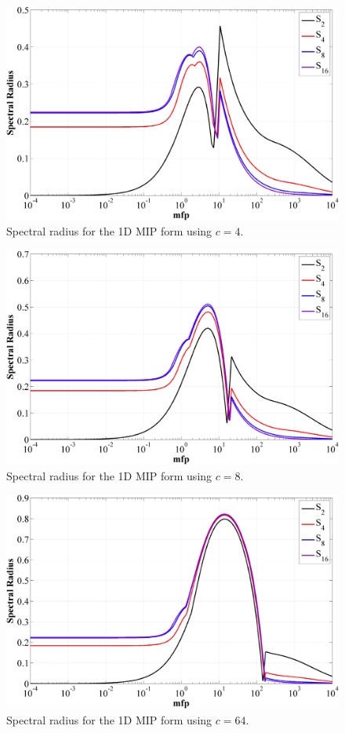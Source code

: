 \begin{figure}
\centering
\includegraphics[width=\textwidth]{figures/appendices/DSA_1D_SI_MIP_C=4.png}
\caption{Spectral radius for the 1D MIP form using $c=4$.}
\label{fig::1D_MIP_c=4}
\end{figure}

\begin{figure}
\centering
\includegraphics[width=\textwidth]{figures/appendices/DSA_1D_SI_MIP_C=8.png}
\caption{Spectral radius for the 1D MIP form using $c=8$.}
\label{fig::1D_MIP_c=8}
\end{figure}

\begin{figure}
\centering
\includegraphics[width=\textwidth]{figures/appendices/DSA_1D_SI_MIP_C=64.png}
\caption{Spectral radius for the 1D MIP form using $c=64$.}
\label{fig::1D_MIP_c=64}
\end{figure}

